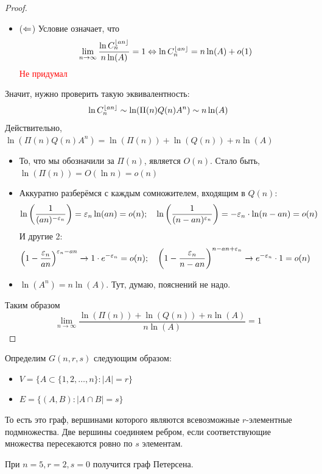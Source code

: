\begin{proof}
\begin{itemize}
		\item ($\Leftarrow$) Условие означает, что
		\[
			\lim_{n \to \infty} \frac{\ln C_n^{\left\lfloor an \right\rfloor}}{n\ln(A)} = 1 \Leftrightarrow \ln C_n^{\left\lfloor an \right\rfloor} = n\ln(A) + o(1)
		\]
		\textcolor{red}{Не придумал}
	\end{itemize}
	Значит, нужно проверить такую эквивалентность:
	\[
		\ln C_n^{\left\lfloor an \right\rfloor} \sim \ln(\Pi(n)Q(n)A^n) \sim n\ln(A)	
	\]
	Действительно, $\ln(\Pi(n)Q(n)A^n) = \ln(\Pi(n)) + \ln(Q(n)) + n\ln(A)$
	\begin{itemize}
		\item То, что мы обозначили за $\Pi(n)$, является $O(n)$. Стало быть, $\ln(\Pi(n)) = O(\ln n) = o(n)$
		
		\item Аккуратно разберёмся с каждым сомножителем, входящим в $Q(n)$:
		\[
			\ln\left(\frac{1}{(an)^{-\varepsilon_n}}\right) = \varepsilon_n \ln(an) = o(n); \quad \ln\left(\frac{1}{(n - an)^{\varepsilon_n}}\right) = -\varepsilon_n \cdot \ln(n - an) = o(n)
		\]
		И другие 2:
		\[
			\left(1 - \frac{\varepsilon_n}{an}\right)^{\varepsilon_n - an} \xrightarrow{} 1 \cdot e^{-\varepsilon_n} = o(n); \quad \left(1 - \frac{\varepsilon_n}{n - an}\right)^{n - an + \varepsilon_n} \xrightarrow{} e^{-\varepsilon_n} \cdot 1 = o(n)
		\]
		
		\item $\ln(A^n) = n\ln(A)$. Тут, думаю, пояснений не надо.
	\end{itemize}
	Таким образом
	\[
		\lim_{n \to \infty} \frac{\ln(\Pi(n)) + \ln(Q(n)) + n\ln(A)}{n\ln(A)} = 1
	\]
\end{proof}

\begin{definition}

Определим $G(n,r,s)$ следующим образом:

\begin{itemize}
    \item $V = \{A \subset \{1,2,\dots,n\}:|A|=r\}$
    \item $E=\{(A,B): |A \cap B| = s\}$
\end{itemize}


То есть это граф, вершинами которого являются всевозможные $r$-элементные подмножества. Две вершины соединяем ребром, если соответствующие множества пересекаются ровно по $s$ элементам.

\end{definition}

\begin{example}
При $n = 5, r = 2, s = 0$ получится граф Петерсена.

\end{example}

